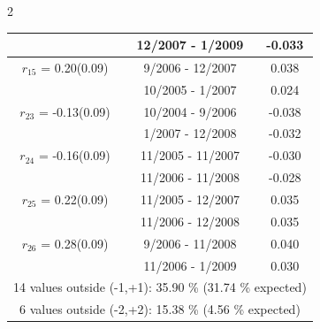 \begin{multicols}{2}
{\begin{tabular}{ccc}
  &       12/2007 -  1/2009 &       -0.033  \vspace{-.02in}   \\ \hline 
    $r_{15}$ = 0.20(0.09) &       9/2006 - 12/2007 &        0.038   \vspace{-.10in} \\  
&       10/2005 -  1/2007 &        0.024  \vspace{-.02in} \\ \hline 
  $r_{23}$ = -0.13(0.09) &      10/2004 -  9/2006 &       -0.038    \vspace{-.10in} \\ 
  &        1/2007 - 12/2008 &       -0.032  \vspace{-.02in}   \\ \hline 
    $r_{24}$ = -0.16(0.09) &      11/2005 - 11/2007 &       -0.030    \vspace{-.10in} \\ 
  &       11/2006 - 11/2008 &       -0.028  \vspace{-.02in}   \\ \hline 
    $r_{25}$ = 0.22(0.09) &      11/2005 - 12/2007 &        0.035   \vspace{-.10in} \\  
&       11/2006 - 12/2008 &        0.035  \vspace{-.02in} \\ \hline 
  $r_{26}$ = 0.28(0.09) &       9/2006 - 11/2008 &        0.040   \vspace{-.10in} \\  
&       11/2006 -  1/2009 &        0.030  \vspace{-.02in} \\ \hline 
\multicolumn{3}{c}{              14 values outside (-1,+1): 35.90  \% (31.74  \% expected)}\vspace{-.10in} \\ 
\multicolumn{3}{c}{               6 values outside (-2,+2): 15.38 \%  (4.56 \% expected) } \\
 \end{tabular} \\ 
 } 
\end{multicols} 
